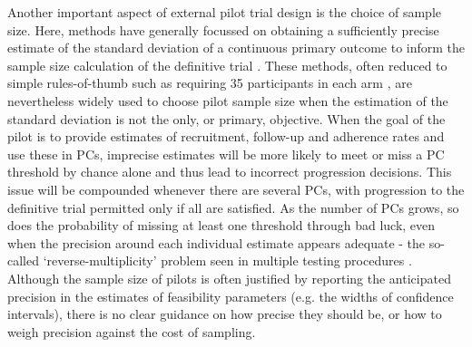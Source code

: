 \documentclass[AMA,STIX1COL]{WileyNJD-v2}
\begin{document}

Another important aspect of external pilot trial design is the choice of sample size. Here, methods have generally focussed on obtaining a sufficiently precise estimate of the standard deviation of a continuous primary outcome to inform the sample size calculation of the definitive trial \cite{Teare2014, Browne1995, Julious2005, Sim2012, Eldridge2015, Whitehead2015}. These methods, often reduced to simple rules-of-thumb such as requiring 35 participants in each arm \cite{Teare2014}, are nevertheless widely used to choose pilot sample size when the estimation of the standard deviation is not the only, or primary, objective. When the goal of the pilot is to provide estimates of recruitment, follow-up and adherence rates and use these in PCs, imprecise estimates will be more likely to meet or miss a PC threshold by chance alone \cite{Eldridge2015, Cooper2018} and thus lead to incorrect progression decisions. This issue will be compounded whenever there are several PCs, with progression to the definitive trial permitted only if all are satisfied. As the number of PCs grows, so does the probability of missing at least one threshold through bad luck, even when the precision around each individual estimate appears adequate - the so-called `reverse-multiplicity' problem seen in multiple testing procedures \cite{Senn2007, Chuang-Stein2007}. Although the sample size of pilots is often justified by reporting the anticipated precision in the estimates of feasibility parameters (e.g. the widths of confidence intervals), there is no clear guidance on how precise they should be, or how to weigh precision against the cost of sampling.


\end{document}
